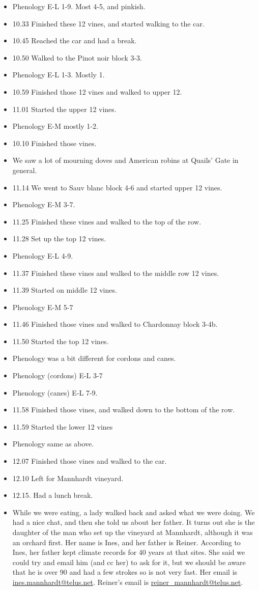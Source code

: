 \documentclass[11pt,letter]{article}
\newenvironment{smitemize}{
\begin{itemize}
  \setlength{\itemsep}{0pt}
  \setlength{\parskip}{0.8pt}
  \setlength{\parsep}{0pt}}
{\end{itemize}
}
\begin{document}
\begin{smitemize}
\item Phenology E-L 1-9. Most 4-5, and pinkish.
\item 10.33 Finished these 12 vines, and started walking to the car. 
\item 10.45 Reached the car and had a break.  
\item 10.50 Walked to the Pinot noir block 3-3.
\item Phenology E-L 1-3. Mostly 1. 
\item 10.59 Finished those 12 vines and walked to upper 12.
\item 11.01 Started the upper 12 vines.
\item Phenology E-M mostly 1-2.
\item 10.10 Finished those vines. 
\item We saw a lot of mourning doves and American robins at Quails' Gate in general. 
\item 11.14 We went to Sauv blanc block 4-6 and started upper 12 vines. 
\item Phenology E-M 3-7.
\item 11.25 Finished these vines and walked to the top of the row. 
\item 11.28 Set up the top 12 vines. 
\item Phenology E-L 4-9.
\item 11.37 Finished these vines and walked to the middle row 12 vines.
\item 11.39 Started on middle 12 vines.
\item Phenology E-M 5-7 
\item 11.46 Finished those vines and walked to Chardonnay block 3-4b.
\item 11.50 Started the top 12 vines. 
\item Phenology was a bit different for cordons and canes. 
\item Phenology (cordons) E-L 3-7 
\item Phenology (canes) E-L 7-9.
\item 11.58 Finished those vines, and walked down to the bottom of the row. 
\item 11.59 Started the lower 12 vines
\item Phenology same as above. 
\item 12.07 Finished those vines and walked to the car.
\item 12.10 Left for Mannhardt vineyard.  
\item 12.15. Had a lunch break.
\item While we were eating, a lady walked back and asked what we were doing. We had a nice chat, and then she told us about her father. It turns out she is the daughter of the man who set up the vineyard at Mannhardt, although it was an orchard first. Her name is Ines, and her father is Reiner. According to Ines, her father kept climate records for 40 years at that sites. She said we could try and email him (and cc her) to ask for it, but we should be aware that he is over 90 and had a few strokes so is not very fast. Her email is \href{mailto:ines.mannhardt@telus.net}{ines.mannhardt@telus.net}. Reiner's email is \href{mailto:reiner_mannhardt@telus.net}{reiner\_mannhardt@telus.net}.

\end{smitemize}
\end{document}
